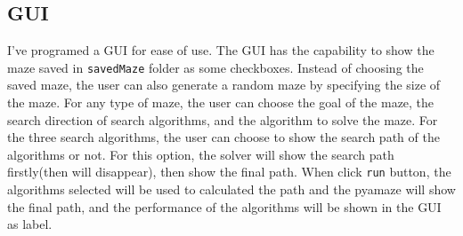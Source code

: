 \documentclass{article}
\begin{document}
\subsection{GUI}
I've programed a GUI for ease of use.
 The GUI has the capability to show the maze saved in \texttt{savedMaze} folder as some checkboxes. Instead of choosing the saved maze, the user can also generate a random maze by specifying the size of the maze.
 For any type of maze, the user can choose the goal of the maze, the search direction of search algorithms, and the algorithm to solve the maze. For the three search algorithms, the user can choose to show the search path of the algorithms or not. For this option, the solver will show the search path firstly(then will disappear), then show the final path.
 When click \texttt{run} button, the algorithms selected will be used to calculated the path and the pyamaze will show the final path, and the performance of the algorithms will be shown in the GUI as label. 
\end{document}
